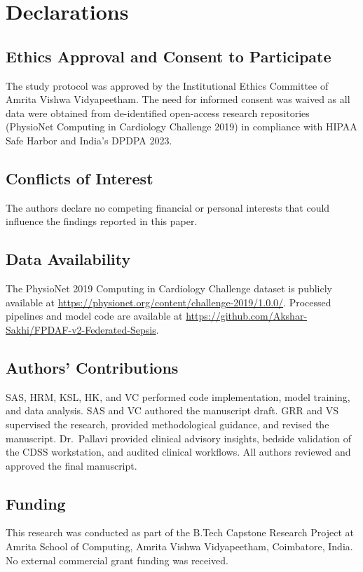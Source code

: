 \documentclass[11pt,a4paper]{article}
\begin{document}
\section*{Declarations}

\subsection*{Ethics Approval and Consent to Participate}
The study protocol was approved by the Institutional Ethics Committee of Amrita Vishwa Vidyapeetham. The need for informed consent was waived as all data were obtained from de-identified open-access research repositories (PhysioNet Computing in Cardiology Challenge 2019) in compliance with HIPAA Safe Harbor and India's DPDPA 2023.

\subsection*{Conflicts of Interest}
The authors declare no competing financial or personal interests that could influence the findings reported in this paper.

\subsection*{Data Availability}
The PhysioNet 2019 Computing in Cardiology Challenge dataset is publicly available at \url{https://physionet.org/content/challenge-2019/1.0.0/}. Processed pipelines and model code are available at \url{https://github.com/Akshar-Sakhi/FPDAF-v2-Federated-Sepsis}.

\subsection*{Authors' Contributions}
SAS, HRM, KSL, HK, and VC performed code implementation, model training, and data analysis. SAS and VC authored the manuscript draft. GRR and VS supervised the research, provided methodological guidance, and revised the manuscript. Dr.~Pallavi provided clinical advisory insights, bedside validation of the CDSS workstation, and audited clinical workflows. All authors reviewed and approved the final manuscript.

\subsection*{Funding}
This research was conducted as part of the B.Tech Capstone Research Project at Amrita School of Computing, Amrita Vishwa Vidyapeetham, Coimbatore, India. No external commercial grant funding was received.



\end{document}
